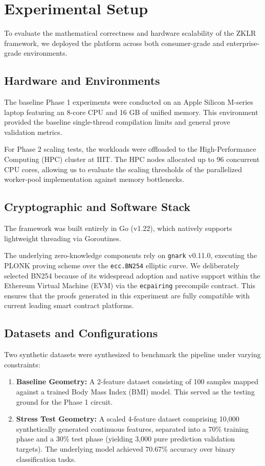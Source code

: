 \chapter{Experimental Setup}

To evaluate the mathematical correctness and hardware scalability of the ZKLR framework, we deployed the platform across both consumer-grade and enterprise-grade environments.

\section{Hardware and Environments}
The baseline Phase 1 experiments were conducted on an Apple Silicon M-series laptop featuring an 8-core CPU and 16 GB of unified memory. This environment provided the baseline single-thread compilation limits and general prove validation metrics.

For Phase 2 scaling tests, the workloads were offloaded to the High-Performance Computing (HPC) cluster at IIIT. The HPC nodes allocated up to 96 concurrent CPU cores, allowing us to evaluate the scaling thresholds of the parallelized worker-pool implementation against memory bottlenecks.



\section{Cryptographic and Software Stack}
The framework was built entirely in Go (v1.22), which natively supports lightweight threading via Goroutines. 

The underlying zero-knowledge components rely on \texttt{gnark} v0.11.0, executing the PLONK proving scheme over the \texttt{ecc.BN254} elliptic curve. We deliberately selected BN254 because of its widespread adoption and native support within the Ethereum Virtual Machine (EVM) via the \texttt{ecpairing} precompile contract. This ensures that the proofs generated in this experiment are fully compatible with current leading smart contract platforms.

\section{Datasets and Configurations}
Two synthetic datasets were synthesized to benchmark the pipeline under varying constraints:
\begin{enumerate}
    \item \textbf{Baseline Geometry:} A 2-feature dataset consisting of 100 samples mapped against a trained Body Mass Index (BMI) model. This served as the testing ground for the Phase 1 circuit.
    \item \textbf{Stress Test Geometry:} A scaled 4-feature dataset comprising 10,000 synthetically generated continuous features, separated into a 70\% training phase and a 30\% test phase (yielding 3,000 pure prediction validation targets). The underlying model achieved 70.67\% accuracy over binary classification tasks.
\end{enumerate}

